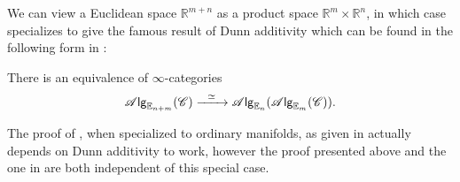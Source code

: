 \documentclass[../text.tex]{subfiles}
\begin{document}
\begin{example}
    We can view a Euclidean space $\mathbb{R}^{m+n}$ as a product space $\mathbb{R}^m \times \mathbb{R}^n$, in which case  specializes to give the famous result of Dunn additivity \cite{dunn1988} which can be found in the following form in \cite{lurie_ha}:
    \begin{proposition}\label{prop:dunn_additivity}
        There is an equivalence of $\infty$-categories
        \begin{equation}
            \mathscr{A} \mathsf{lg}_{\mathbb{E}_{n + m}} (\mathscr{C}) \xrightarrow{\ \ \simeq \ \ } \mathscr{A} \mathsf{lg}_{\mathbb{E}_n} (\mathscr{A} \mathsf{lg}_{\mathbb{E}_m} (\mathscr{C})).
        \end{equation}
    \end{proposition}
\end{example}

\begin{remark}
    The proof of , when specialized to ordinary manifolds, as given in \cite{ginot2015} actually depends on Dunn additivity to work, however the proof presented above and the one in \cite{lurie_ha} are both independent of this special case. 
\end{remark}
\end{document}
